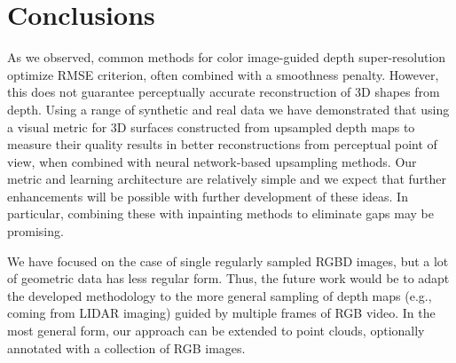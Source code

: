 
\section{Conclusions}
\label{sec:concl}

As we observed, common methods for color image-guided depth super-resolution optimize RMSE criterion, often combined with a smoothness penalty. However, this does not guarantee perceptually accurate reconstruction of 3D shapes from depth. Using a range of synthetic and real data we have demonstrated that using a visual metric for 3D surfaces constructed from upsampled depth maps to measure their quality results in better reconstructions from perceptual point of view, when combined with neural network-based 
upsampling methods.  Our metric  and learning architecture are relatively simple and we expect that further enhancements will be possible with further development of these ideas. In particular, combining these with inpainting methods to eliminate gaps
may be promising. 

We have focused on the case of single regularly sampled RGBD images, but a lot of geometric data has less regular form. Thus, the future work would be to adapt the developed methodology to the more general sampling of depth maps (e.g., coming from LIDAR imaging)  guided by multiple frames of RGB video. In the most general form, our approach can be extended to point clouds, optionally annotated with a collection of RGB images.


